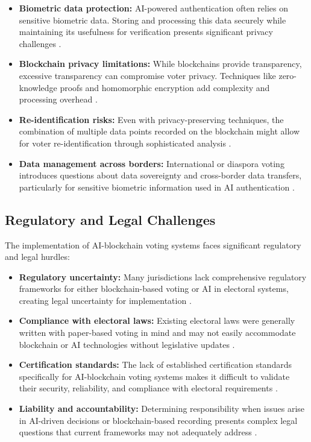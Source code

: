 \documentclass[conference]{IEEEtran}
\begin{document}
\begin{itemize}
    \item \textbf{Biometric data protection:} AI-powered authentication often relies on sensitive biometric data. Storing and processing this data securely while maintaining its usefulness for verification presents significant privacy challenges \cite{b12}.
    
    \item \textbf{Blockchain privacy limitations:} While blockchains provide transparency, excessive transparency can compromise voter privacy. Techniques like zero-knowledge proofs and homomorphic encryption add complexity and processing overhead \cite{b17}.
    
    \item \textbf{Re-identification risks:} Even with privacy-preserving techniques, the combination of multiple data points recorded on the blockchain might allow for voter re-identification through sophisticated analysis \cite{b16}.
    
    \item \textbf{Data management across borders:} International or diaspora voting introduces questions about data sovereignty and cross-border data transfers, particularly for sensitive biometric information used in AI authentication \cite{b18}.
\end{itemize}

\subsection{Regulatory and Legal Challenges}
The implementation of AI-blockchain voting systems faces significant regulatory and legal hurdles:

\begin{itemize}
    \item \textbf{Regulatory uncertainty:} Many jurisdictions lack comprehensive regulatory frameworks for either blockchain-based voting or AI in electoral systems, creating legal uncertainty for implementation \cite{b9}.
    
    \item \textbf{Compliance with electoral laws:} Existing electoral laws were generally written with paper-based voting in mind and may not easily accommodate blockchain or AI technologies without legislative updates \cite{b10}.
    
    \item \textbf{Certification standards:} The lack of established certification standards specifically for AI-blockchain voting systems makes it difficult to validate their security, reliability, and compliance with electoral requirements \cite{b8}.
    
    \item \textbf{Liability and accountability:} Determining responsibility when issues arise in AI-driven decisions or blockchain-based recording presents complex legal questions that current frameworks may not adequately address \cite{b17}.
\end{itemize}
\end{document}
